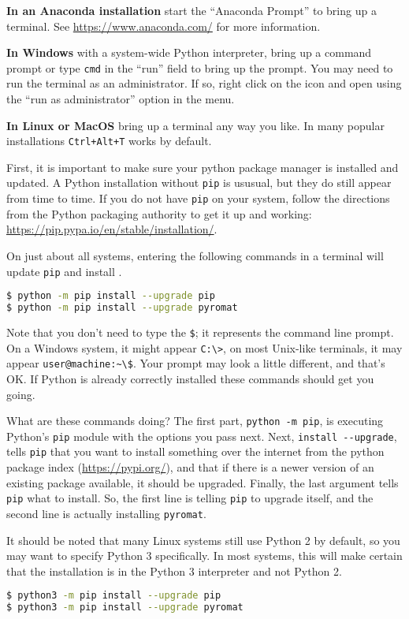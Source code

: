 {\bf In an Anaconda installation} start the ``Anaconda Prompt'' to bring up a terminal.  See \url{https://www.anaconda.com/} for more information.

{\bf In Windows} with a system-wide Python interpreter, bring up a command prompt or type \texttt{cmd} in the ``run'' field to bring up the prompt.  You may need to run the terminal as an administrator.  If so, right click on the icon and open using the ``run as administrator'' option in the menu.

{\bf In Linux or MacOS} bring up a terminal any way you like.  In many popular installations \texttt{Ctrl+Alt+T} works by default.

First, it is important to make sure your python package manager is installed and updated.  A Python installation without \texttt{pip} is ususual, but they do still appear from time to time.  If you do not have \texttt{pip} on your system, follow the directions from the Python packaging authority to get it up and working: \url{https://pip.pypa.io/en/stable/installation/}.

On just about all systems, entering the following commands in a terminal will update \texttt{pip} and install \PM.
\begin{lstlisting}[language=bash]
$ python -m pip install --upgrade pip
$ python -m pip install --upgrade pyromat
\end{lstlisting}
Note that you don't need to type the \verb|$|; it represents the command line prompt. On a Windows system, it might appear \verb|C:\>|, on most Unix-like terminals, it may appear \verb|user@machine:~\$|.  Your prompt may look a little different, and that's OK.  If Python is already correctly installed these commands should get you going.

What are these commands doing?  The first part, \verb|python -m pip|, is executing Python's \texttt{pip} module with the options you pass next.  Next, \verb|install --upgrade|, tells \verb|pip| that you want to install something over the internet from the python package index (\url{https://pypi.org/}), and that if there is a newer version of an existing package available, it should be upgraded.  Finally, the last argument tells \texttt{pip} what to install.  So, the first line is telling \verb|pip| to upgrade itself, and the second line is actually installing \verb|pyromat|.

It should be noted that many Linux systems still use Python 2 by default, so you may want to specify Python 3 specifically.  In most systems, this will make certain that the installation is in the Python 3 interpreter and not Python 2.
\begin{lstlisting}[language=bash]
$ python3 -m pip install --upgrade pip
$ python3 -m pip install --upgrade pyromat
\end{lstlisting}

